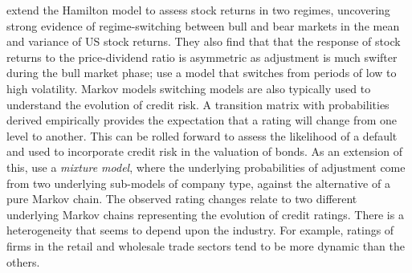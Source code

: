 \documentclass[12pt, a4paper, oneside]{article}\usepackage[]{graphicx}\usepackage[]{color}
\begin{document}
\citet{schaller1997regime} extend the Hamilton model to assess stock returns in two regimes, uncovering strong evidence of regime-switching between bull and bear markets in the mean and variance of US stock returns.  They also find that that the response of stock returns to the price-dividend ratio is asymmetric as adjustment is much swifter during the bull market phase; \citet{dueker1997markov} use a model that switches from periods of low to high volatility. Markov models switching models are also typically used to understand the evolution of credit risk.  A transition matrix with probabilities derived empirically provides the expectation that a rating will change from one level to another.  This can be rolled forward to assess the likelihood of a default and used to incorporate credit risk in the valuation of bonds.  As an extension of this,  \citet{frydman2008credit} use a \emph{mixture model}, where the underlying probabilities of adjustment come from two underlying sub-models of company type, against the alternative of a pure Markov chain. The observed rating changes relate to two different underlying Markov chains representing the evolution of credit ratings.  There is a heterogeneity that seems to depend upon the industry.  For example, ratings of firms in the retail and wholesale trade sectors tend to be more dynamic than the others. 





\end{document}
